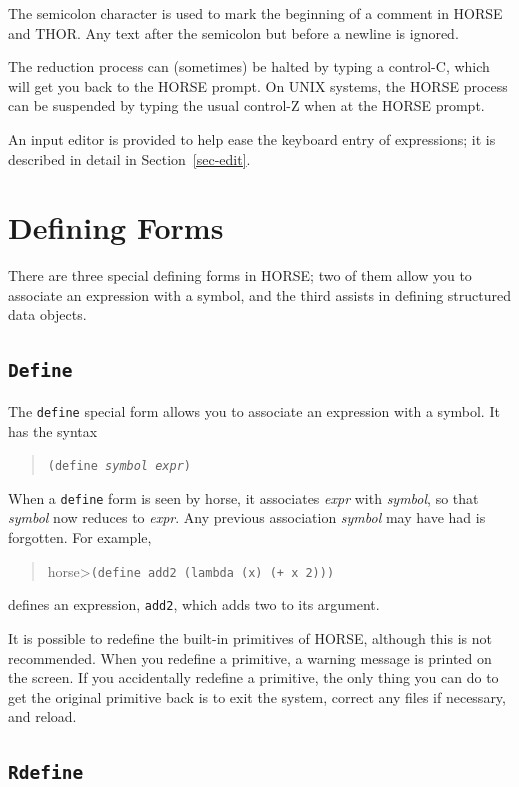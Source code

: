 	The semicolon character is used to mark the beginning of a comment in
HORSE and THOR.  Any text after the semicolon but before a newline
is ignored.

	The reduction process can (sometimes) be halted by typing a
control-C, which will get you back to the HORSE prompt.  On UNIX systems,
the HORSE process can be suspended by typing the usual control-Z when
at the HORSE prompt.

	An input editor is provided to help ease the keyboard entry of
expressions; it is described in detail in Section~\ref{sec-edit}.



\section{Defining Forms}
\label{sec-defining}

	There are three special defining forms in HORSE; two of them allow you
to associate an expression with a symbol, and the third assists in
defining structured data objects.

\subsection{{\tt Define}}

	The {\tt define} special form allows you to associate an expression
with a symbol. It has the syntax
\begin{quote}
	{\tt (define {\sl symbol  expr})}
\end{quote}
When a {\tt define} form is seen by horse, it associates {\sl expr} 
with {\sl symbol}, so that {\sl symbol} now reduces to
{\sl expr}.  Any previous association {\sl symbol} may have had is
forgotten.  For example,
\begin{quote}
	{\sc horse>}{\tt (define add2 (lambda (x) (+ x 2)))}
\end{quote}
defines an expression, {\tt add2}, which adds two to its argument.

	It is possible to redefine the built-in primitives of HORSE,
although this is not recommended.
When you redefine a primitive, a warning message is printed on the
screen.  If you accidentally redefine a primitive, the only thing you can
do to get the original primitive back is to exit the system, correct any
files if necessary, and reload.

\subsection{{\tt Rdefine}}

